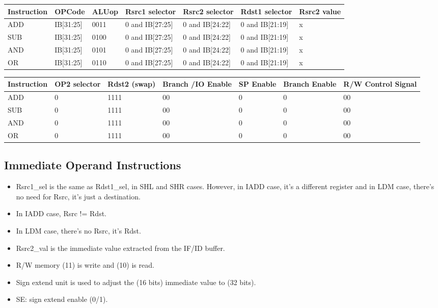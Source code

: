 \begin{center}
\begin{tabular}{||p{20mm}| p{15mm}| p{15mm}| p{15mm}| p{15mm}| p{15mm}| p{15mm}||} 
\hline
Instruction & OPCode & ALUop & Rsrc1 selector & Rsrc2 selector & Rdst1 selector & Rsrc2 value  \\ [0.5ex] 
\hline\hline
ADD & IB[31:25] & 0011 & 0 and IB[27:25] & 0 and IB[24:22] & 0 and IB[21:19] & x \\
\hline
SUB & IB[31:25] & 0100 & 0 and IB[27:25] & 0 and IB[24:22] & 0 and IB[21:19] & x \\
\hline
AND & IB[31:25] & 0101 & 0 and IB[27:25] & 0 and IB[24:22] & 0 and IB[21:19] & x \\
\hline
OR  & IB[31:25] & 0110 & 0 and IB[27:25] & 0 and IB[24:22] & 0 and IB[21:19] & x \\
\hline
\end{tabular}
\end{center}

\begin{center}
\begin{tabular}{||p{20mm}| p{15mm}| p{15mm}| p{15mm}| p{15mm}| p{15mm}| p{15mm}||} 
\hline
Instruction & OP2 selector & Rdst2 (swap) & Branch /IO Enable & SP Enable & Branch Enable & R/W Control Signal  \\ [0.5ex] 
\hline\hline
ADD & 0 & 1111 & 00 & 0 & 0 & 00 \\
\hline
SUB & 0 & 1111 & 00 & 0 & 0 & 00 \\
\hline
AND & 0 & 1111 & 00 & 0 & 0 & 00 \\
\hline
OR  & 0 & 1111 & 00 & 0 & 0 & 00 \\
\hline
\end{tabular}
\end{center}

\subsection{Immediate Operand Instructions}
\begin{itemize}
    \item Rsrc1\_sel is the same as Rdst1\_sel, in SHL and SHR cases. However, in IADD case, it's a different register and in LDM case, there's no need for Rsrc, it's just a destination.
    \item In IADD case, Rsrc != Rdst.
    \item In LDM case, there's no Rsrc, it's Rdst.
    \item Rsrc2\_val is the immediate value extracted from the IF/ID buffer.
    \item R/W memory (11) is write and (10) is read.
    \item Sign extend unit is used to adjust the (16 bits) immediate value to (32 bits).
    \item SE: sign extend enable (0/1).
\end{itemize}

